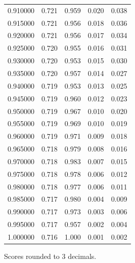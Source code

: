 \begin{table}[htbp]
\begin{tabular}{lllll}
0.910000 & 0.721 & 0.959 & 0.020 & 0.038 \\
0.915000 & 0.721 & 0.956 & 0.018 & 0.036 \\
0.920000 & 0.721 & 0.956 & 0.017 & 0.034 \\
0.925000 & 0.720 & 0.955 & 0.016 & 0.031 \\
0.930000 & 0.720 & 0.953 & 0.015 & 0.030 \\
0.935000 & 0.720 & 0.957 & 0.014 & 0.027 \\
0.940000 & 0.719 & 0.953 & 0.013 & 0.025 \\
0.945000 & 0.719 & 0.960 & 0.012 & 0.023 \\
0.950000 & 0.719 & 0.967 & 0.010 & 0.020 \\
0.955000 & 0.719 & 0.969 & 0.010 & 0.019 \\
0.960000 & 0.719 & 0.971 & 0.009 & 0.018 \\
0.965000 & 0.718 & 0.979 & 0.008 & 0.016 \\
0.970000 & 0.718 & 0.983 & 0.007 & 0.015 \\
0.975000 & 0.718 & 0.978 & 0.006 & 0.012 \\
0.980000 & 0.718 & 0.977 & 0.006 & 0.011 \\
0.985000 & 0.717 & 0.980 & 0.004 & 0.009 \\
0.990000 & 0.717 & 0.973 & 0.003 & 0.006 \\
0.995000 & 0.717 & 0.957 & 0.002 & 0.004 \\
1.000000 & 0.716 & 1.000 & 0.001 & 0.002 \\
\bottomrule
\end{tabular}

\begin{tablenotes}[flushleft]
\item \small{Scores rounded to 3 decimals.}
\end{tablenotes}
\end{table}